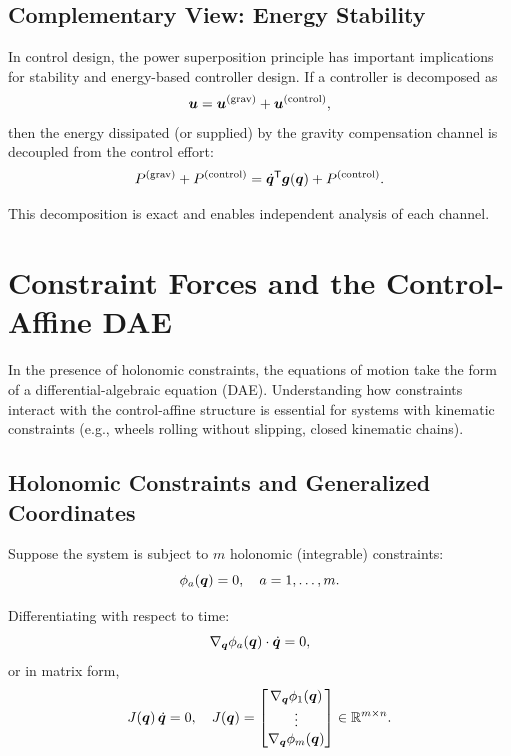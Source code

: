 \subsection{Complementary View: Energy Stability}

In control design, the power superposition principle has important implications for stability
and energy-based controller design. If a controller is decomposed as
\begin{equation}
\bm{u} = \bm{u}^{(\text{grav})} + \bm{u}^{(\text{control})},
\end{equation}
then the energy dissipated (or supplied) by the gravity compensation channel is decoupled
from the control effort:
\begin{equation}
P^{(\text{grav})} + P^{(\text{control})} = \dot{\bm{q}}^{\mathsf{T}} \bm{g}(\bm{q}) + P^{(\text{control})}.
\end{equation}

This decomposition is exact and enables independent analysis of each channel.


\section{Constraint Forces and the Control-Affine DAE}

In the presence of holonomic constraints, the equations of motion take the form of a
differential-algebraic equation (DAE). Understanding how constraints interact with the
control-affine structure is essential for systems with kinematic constraints (e.g., wheels
rolling without slipping, closed kinematic chains).

\subsection{Holonomic Constraints and Generalized Coordinates}

Suppose the system is subject to $m$ holonomic (integrable) constraints:
\begin{equation}
\phi_a(\bm{q}) = 0, \quad a = 1,\ldots,m.
\label{eq:ch3:constraints}
\end{equation}

Differentiating with respect to time:
\begin{equation}
\nabla_{\bm{q}} \phi_a(\bm{q}) \cdot \dot{\bm{q}} = 0,
\label{eq:ch3:constraint-velocity}
\end{equation}
or in matrix form,
\begin{equation}
J(\bm{q})\,\dot{\bm{q}} = 0, \quad J(\bm{q}) = \begin{bmatrix}
\nabla_{\bm{q}} \phi_1(\bm{q}) \\
\vdots \\
\nabla_{\bm{q}} \phi_m(\bm{q})
\end{bmatrix} \in \mathbb{R}^{m \times n}.
\label{eq:ch3:constraint-jacobian}
\end{equation}


